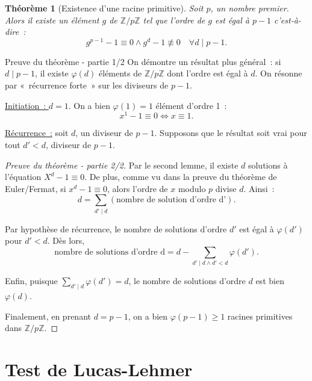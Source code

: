 \documentclass[10pt, mathserif]{beamer}
\newcommand{\Z}{\mathbb Z}
\newtheorem{thm}{Théorème}[section]
\theoremstyle{definition}
\theoremstyle{remark}
\begin{document}
	\begin{frame}
		\begin{thm}[Existence d'une racine primitive]
			Soit $p$, un nombre premier. Alors il existe un élément $g$ de $\Z/p\Z$ tel que l'ordre de $g$ est égal à $p-1$ c'est-à-dire~:
			\[g^{p-1}-1 \equiv 0 \land g^{d}-1 \not \equiv 0 \quad \forall d \mid p-1.\]
		\end{thm}

		\begin{block}{Preuve du théorème - partie 1/2}
			 On démontre un résultat plus général~: si $d \mid p-1$, il existe $\varphi(d)$ éléments de $\Z/p\Z$ dont l'ordre est égal à $d$. On résonne par
			 «~récurrence forte~» sur les diviseurs de $p-1$.
			 
			 \underline{Initiation~: $d = 1$}. On a bien $\varphi(1) = 1$ élément d'ordre 1~:
			 \[x^1 - 1 \equiv 0 \iff x \equiv 1.\]
			 
			 \underline{Récurrence~:} soit $d$, un diviseur de $p-1$. Supposons que le résultat soit vrai pour tout $d' < d$, diviseur de $p-1$.
		\end{block}
	\end{frame}

	\begin{frame}
		\begin{proof}[Preuve du théorème - partie 2/2]
			Par le second lemme, il existe $d$ solutions à l'équation $X^d-1\equiv 0$. De plus, comme vu dans la preuve du théorème de Euler/Fermat,
			si $x^d - 1 \equiv 0$, alors l'ordre de $x$ modulo $p$ divise $d$. Ainsi~:
			\[d = \sum_{d'\mid d}\left(\text{nombre de solution d'ordre d'}\right).\]
			
			Par hypothèse de récurrence, le nombre de solutions d'ordre $d'$ est égal à $\varphi(d')$ pour $d' < d$. Dès lors,
			\[\text{nombre de solutions d'ordre d} = d - \sum_{d' \mid d \land d' < d}\varphi(d').\]

			Enfin, puisque $\sum_{d'\mid d}\varphi(d') = d$, le nombre de solutions d'ordre $d$ est bien $\varphi(d)$.
			
			Finalement, en prenant $d = p-1$, on a bien $\varphi(p-1) \ge 1$ racines primitives dans $\Z/p\Z$.
		\end{proof}
	\end{frame}

\section{Test de Lucas-Lehmer}
\end{document}
